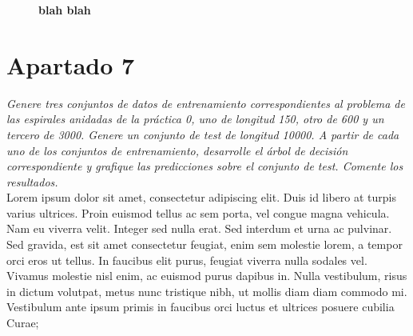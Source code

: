 \documentclass[a4paper, 11pt]{article} %
\begin{document}
\begin{figure}
  \centering
  \caption*{\textbf{blah blah}}

\end{figure}


\section*{Apartado 7}  \textit{Genere tres conjuntos de datos de entrenamiento
correspondientes al problema de las espirales anidadas de la práctica 0, uno de
longitud 150, otro de 600 y un tercero de 3000. Genere un conjunto de test de
longitud 10000. A partir de cada uno de los conjuntos de entrenamiento,
desarrolle el árbol de decisión correspondiente y grafique las predicciones
sobre el conjunto de test. Comente los resultados.}\\

Lorem ipsum dolor sit amet, consectetur adipiscing elit. Duis id libero at
turpis varius ultrices. Proin euismod tellus ac sem porta, vel congue magna
vehicula. Nam eu viverra velit. Integer sed nulla erat. Sed interdum et urna ac
pulvinar. Sed gravida, est sit amet consectetur feugiat, enim sem molestie
lorem, a tempor orci eros ut tellus. In faucibus elit purus, feugiat viverra
nulla sodales vel. Vivamus molestie nisl enim, ac euismod purus dapibus in.
Nulla vestibulum, risus in dictum volutpat, metus nunc tristique nibh, ut
mollis diam diam commodo mi. Vestibulum ante ipsum primis in faucibus orci
luctus et ultrices posuere cubilia Curae; 
\end{document}
